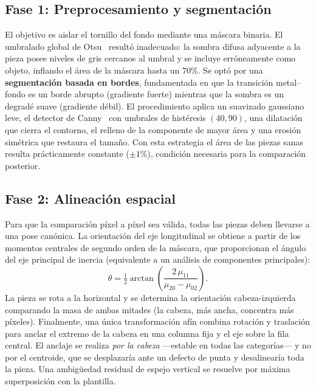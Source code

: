 \documentclass[final]{article}
\begin{document}
\subsection{Fase 1: Preprocesamiento y segmentación}

El objetivo es aislar el tornillo del fondo mediante una máscara binaria.
El umbralado global de Otsu~\cite{otsu1979} resultó inadecuado: la sombra
difusa adyacente a la pieza posee niveles de gris cercanos al umbral y se
incluye erróneamente como objeto, inflando el área de la máscara hasta un
70\%. Se optó por una \textbf{segmentación basada en bordes}, fundamentada en
que la transición metal--fondo es un borde abrupto (gradiente fuerte) mientras
que la sombra es un degradé suave (gradiente débil). El procedimiento aplica un
suavizado gaussiano leve, el detector de Canny~\cite{canny1986} con umbrales
de histéresis $(40, 90)$, una dilatación que cierra el contorno, el relleno de
la componente de mayor área y una erosión simétrica que restaura el tamaño.
Con esta estrategia el área de las piezas sanas resulta prácticamente
constante ($\pm 1\%$), condición necesaria para la comparación posterior.

\subsection{Fase 2: Alineación espacial}

Para que la comparación píxel a píxel sea válida, todas las piezas deben
llevarse a una pose canónica. La orientación del eje longitudinal se obtiene
a partir de los momentos centrales de segundo orden de la máscara, que
proporcionan el ángulo del eje principal de inercia (equivalente a un análisis
de componentes principales):
\begin{equation}
\theta = \tfrac{1}{2}\arctan\!\left(\frac{2\,\mu_{11}}{\mu_{20}-\mu_{02}}\right).
\end{equation}
La pieza se rota a la horizontal y se determina la orientación cabeza-izquierda
comparando la masa de ambas mitades (la cabeza, más ancha, concentra más
píxeles). Finalmente, una única transformación afín combina rotación y
traslación para anclar el extremo de la cabeza en una columna fija y el eje
sobre la fila central. El anclaje se realiza \emph{por la cabeza} —estable en
todas las categorías— y no por el centroide, que se desplazaría ante un defecto
de punta y desalinearía toda la pieza. Una ambigüedad residual de espejo
vertical se resuelve por máxima superposición con la plantilla.
\end{document}
